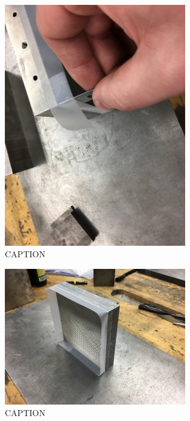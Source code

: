 \begin{figure}
	\centering
        \includegraphics[width=0.7\textwidth]{appendix_sample_prep/dds_wrap_trim.jpg}
   	\caption{CAPTION}
  	\label{Fig:dds_wrap_trim}
\end{figure}

\clearpage

\begin{figure}
	\centering
        \includegraphics[width=0.7\textwidth]{appendix_sample_prep/dds_two_tape_layers.jpg}
   	\caption{CAPTION}
  	\label{Fig:dds_two_tape_layers}
\end{figure}

